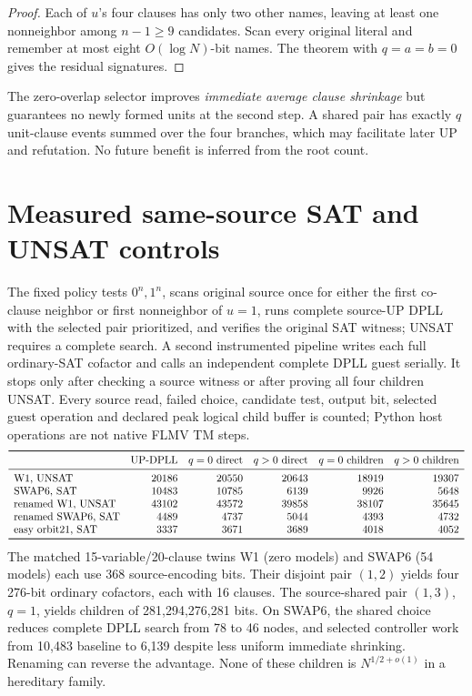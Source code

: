 \documentclass[11pt]{article}
\begin{document}
\begin{proof}
Each of $u$'s four clauses has only two other names, leaving at least one nonneighbor among $n-1\ge9$ candidates. Scan every original literal and remember at most eight $O(\log N)$-bit names. The theorem with $q=a=b=0$ gives the residual signatures.
\end{proof}
\noindent The zero-overlap selector improves \emph{immediate average clause shrinkage} but guarantees no newly formed units at the second step. A shared pair has exactly $q$ unit-clause events summed over the four branches, which may facilitate later UP and refutation. No future benefit is inferred from the root count.
\section{Measured same-source SAT and UNSAT controls}
The fixed policy tests $0^n,1^n$, scans original source once for either the first co-clause neighbor or first nonneighbor of $u=1$, runs complete source-UP DPLL with the selected pair prioritized, and verifies the original SAT witness; UNSAT requires a complete search. A second instrumented pipeline writes each full ordinary-SAT cofactor and calls an independent complete DPLL guest serially. It stops only after checking a source witness or after proving all four children UNSAT. Every source read, failed choice, candidate test, output bit, selected guest operation and declared peak logical child buffer is counted; Python host operations are not native FLMV TM steps.
\[
\begin{array}{lrrrrr}\toprule
 &\text{UP-DPLL}&q=0\ \text{direct}&q>0\ \text{direct}&q=0\ \text{children}&q>0\ \text{children}\\\midrule
\text{W1, UNSAT}&20186&20550&20643&18919&19307\\
\text{SWAP6, SAT}&10483&10785&6139&9926&5648\\
\text{renamed W1, UNSAT}&43102&43572&39858&38107&35645\\
\text{renamed SWAP6, SAT}&4489&4737&5044&4393&4732\\
\text{easy orbit21, SAT}&3337&3671&3689&4018&4052\\\bottomrule
\end{array}
\]
The matched 15-variable/20-clause twins W1 (zero models) and SWAP6 (54 models) each use 368 source-encoding bits. Their disjoint pair $(1,2)$ yields four 276-bit ordinary cofactors, each with 16 clauses. The source-shared pair $(1,3)$, $q=1$, yields children of 281,294,276,281 bits. On SWAP6, the shared choice reduces complete DPLL search from 78 to 46 nodes, and selected controller work from 10,483 baseline to 6,139 despite less uniform immediate shrinking. Renaming can reverse the advantage. None of these children is $N^{1/2+o(1)}$ in a hereditary family.
\end{document}
